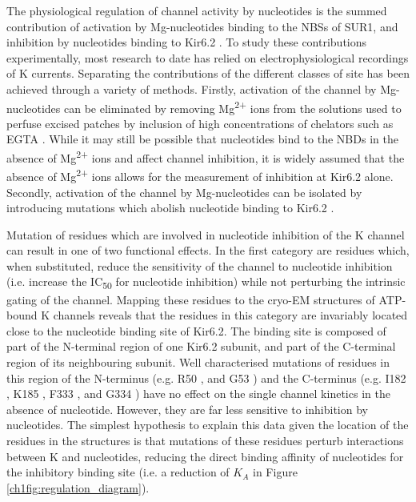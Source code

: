 The physiological regulation of channel activity by nucleotides is the summed contribution of activation by Mg-nucleotides binding to the NBSs of SUR1, and inhibition by nucleotides binding to Kir6.2 \cite{nichols_adenosine_1996}.
To study these contributions experimentally, most research to date has relied on electrophysiological recordings of K\ATP{} currents.
Separating the contributions of the different classes of site has been achieved through a variety of methods.
Firstly, activation of the channel by Mg-nucleotides can be eliminated by removing Mg\textsuperscript{2+} ions from the solutions used to perfuse excised patches by inclusion of high concentrations of chelators such as EGTA \cite{gribble_mgatp_1998-1, proks_activation_2010-1}.
While it may still be possible that nucleotides bind to the NBDs in the absence of Mg\textsuperscript{2+} ions and affect channel inhibition, it is widely assumed that the absence of Mg\textsuperscript{2+} ions allows for the measurement of inhibition at Kir6.2 alone. 
Secondly, activation of the channel by Mg-nucleotides can be isolated by introducing mutations which abolish nucleotide binding to Kir6.2 \cite{gribble_mgatp_1998-1, proks_activation_2010-1}.

Mutation of residues which are involved in nucleotide inhibition of the K\ATP{} channel can result in one of two functional effects.
In the first category are residues which, when substituted, reduce the sensitivity of the channel to nucleotide inhibition (i.e. increase the IC\textsubscript{50} for nucleotide inhibition) while not perturbing the intrinsic gating of the channel.
Mapping these residues to the cryo-EM structures of ATP-bound K\ATP{} channels reveals that the residues in this category are invariably located close to the nucleotide binding site of Kir6.2.
The binding site is composed of part of the N-terminal region of one Kir6.2 subunit, and part of the C-terminal region of its neighbouring subunit.
Well characterised mutations of residues in this region of the N-terminus (e.g. R50 \cite{proks_involvement_1999, cukras_role_2002, john_molecular_2003, ribalet_molecular_2003, trapp_identification_2003, shimomura_mutations_2006}, and G53 \cite{koster_dend_2008}) and the C-terminus (e.g. I182 \cite{drain_katp_1998, koster_atp_2005, li_i182_2000}, K185 \cite{john_molecular_2003, ribalet_molecular_2003, trapp_identification_2003}, F333 \cite{tammaro_kir62_2005}, and G334 \cite{drain_katp_1998, tammaro_kir62_2005, masia_atp-binding_2007-1, proks_activation_2010-1}) have no effect on the single channel kinetics in the absence of nucleotide.
However, they are far less sensitive to inhibition by nucleotides.
The simplest hypothesis to explain this data given the location of the residues in the structures is that mutations of these residues perturb interactions between K\ATP{} and nucleotides, reducing the direct binding affinity of nucleotides for the inhibitory binding site (i.e. a reduction of $K_A$ in Figure \ref{ch1fig:regulation_diagram}).

